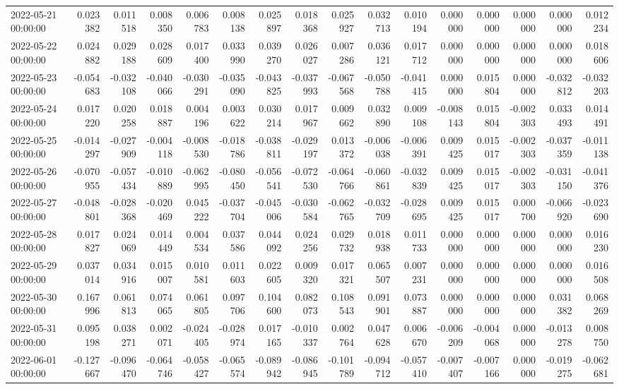 \begin{tabular}{lrrrrrrrrrrrrrrr}
2022-05-21 00:00:00 & 0.023382 & 0.011518 & 0.008350 & 0.006783 & 0.008138 & 0.025897 & 0.018368 & 0.025927 & 0.032713 & 0.010194 & 0.000000 & 0.000000 & 0.000000 & 0.000000 & 0.012234 \\
2022-05-22 00:00:00 & 0.024882 & 0.029188 & 0.028609 & 0.017400 & 0.033990 & 0.039270 & 0.026027 & 0.007286 & 0.036121 & 0.017712 & 0.000000 & 0.000000 & 0.000000 & 0.000000 & 0.018606 \\
2022-05-23 00:00:00 & -0.054683 & -0.032108 & -0.040066 & -0.030291 & -0.035090 & -0.043825 & -0.037993 & -0.067568 & -0.050788 & -0.041415 & 0.000000 & 0.015804 & 0.000000 & -0.032812 & -0.032203 \\
2022-05-24 00:00:00 & 0.017220 & 0.020258 & 0.018887 & 0.004196 & 0.003622 & 0.030214 & 0.017967 & 0.009662 & 0.032890 & 0.009108 & -0.008143 & 0.015804 & -0.002303 & 0.033493 & 0.014491 \\
2022-05-25 00:00:00 & -0.014297 & -0.027909 & -0.004118 & -0.008530 & -0.018786 & -0.038811 & -0.029197 & 0.013372 & -0.006038 & -0.006391 & 0.009425 & 0.015017 & -0.002303 & -0.037359 & -0.011138 \\
2022-05-26 00:00:00 & -0.070955 & -0.057434 & -0.010889 & -0.062995 & -0.080450 & -0.056541 & -0.072530 & -0.064766 & -0.060861 & -0.032839 & 0.009425 & 0.015017 & -0.002303 & -0.031150 & -0.041376 \\
2022-05-27 00:00:00 & -0.048801 & -0.028368 & -0.020469 & 0.045222 & -0.037704 & -0.045006 & -0.030584 & -0.062765 & -0.032709 & -0.028695 & 0.009425 & 0.015017 & 0.000700 & -0.066920 & -0.023690 \\
2022-05-28 00:00:00 & 0.017827 & 0.024069 & 0.014449 & 0.004534 & 0.037586 & 0.044092 & 0.024256 & 0.029732 & 0.018938 & 0.011733 & 0.000000 & 0.000000 & 0.000000 & 0.000000 & 0.016230 \\
2022-05-29 00:00:00 & 0.037014 & 0.034916 & 0.015007 & 0.010581 & 0.011603 & 0.022605 & 0.009320 & 0.017321 & 0.065507 & 0.007231 & 0.000000 & 0.000000 & 0.000000 & 0.000000 & 0.016508 \\
2022-05-30 00:00:00 & 0.167996 & 0.061813 & 0.074065 & 0.061805 & 0.097706 & 0.104600 & 0.082073 & 0.108543 & 0.091901 & 0.073887 & 0.000000 & 0.000000 & 0.000000 & 0.031382 & 0.068269 \\
2022-05-31 00:00:00 & 0.095198 & 0.038271 & 0.002071 & -0.024405 & -0.028974 & 0.017165 & -0.010337 & 0.002764 & 0.047628 & 0.006670 & -0.006209 & -0.004068 & 0.000000 & -0.013278 & 0.008750 \\
2022-06-01 00:00:00 & -0.127667 & -0.096470 & -0.064746 & -0.058427 & -0.065574 & -0.089942 & -0.086945 & -0.101789 & -0.094712 & -0.057410 & -0.007407 & -0.007166 & 0.000000 & -0.019275 & -0.062681 \\

\end{tabular}
